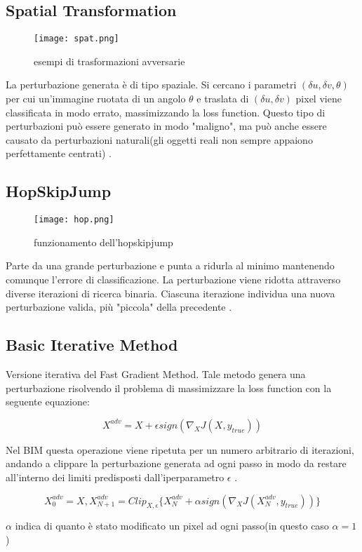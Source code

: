 \subsection{Spatial Transformation}
\begin{figure}[h]
    \texttt{[image: spat.png]}
    \caption{esempi di trasformazioni avversarie\cite{spatial}}
    \label{fig:spat}
\end{figure}
La perturbazione generata è di tipo spaziale. Si cercano i parametri $(\delta u,\delta v,\theta)$ per cui un'immagine ruotata di un angolo $\theta$ e traslata di 
$(\delta u, \delta v)$ pixel viene classificata in modo errato, massimizzando la loss function. Questo tipo di perturbazioni può essere generato in modo "maligno", ma può anche essere causato da perturbazioni naturali(gli oggetti reali
non sempre appaiono perfettamente centrati) \cite{spatial}.
\subsection{HopSkipJump}
\begin{figure}[h]
    \texttt{[image: hop.png]}
    \caption{funzionamento dell'hopskipjump\cite{hopskip}}
    \label{fig:hop}
\end{figure}
Parte da una grande perturbazione e punta a ridurla al minimo mantenendo comunque l'errore di classificazione.
La perturbazione viene ridotta attraverso diverse iterazioni di ricerca binaria. Ciascuna iterazione individua una nuova perturbazione valida, più "piccola" della precedente \cite{hopskip}.
\subsection{Basic Iterative Method}
Versione iterativa del Fast Gradient Method. Tale metodo genera una perturbazione risolvendo il problema di massimizzare la loss function con la seguente equazione:

\[X^{adv} = X + \epsilon sign(\nabla _{X}J(X,y_{true}))\]

Nel BIM  questa operazione viene ripetuta per un numero arbitrario di iterazioni, andando a clippare la perturbazione generata ad ogni passo  in modo da restare
all'interno dei limiti predisposti dall'iperparametro $\epsilon$ \cite{bim}.

\[X^{adv}_{0} = X, X^{adv}_{N+1} = Clip_{X,\epsilon}\{ X^{adv}_{N} + \alpha sign(\nabla _{X}J(X^{adv}_{N},y_{true})) \}\]

$\alpha$ indica di quanto è stato modificato un pixel ad ogni passo(in questo caso $\alpha=1$)
